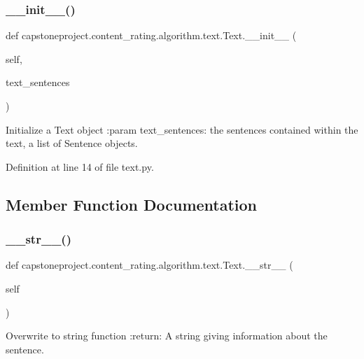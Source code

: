 \subsubsection{\texorpdfstring{\+\_\+\+\_\+init\+\_\+\+\_\+()}{\_\_init\_\_()}}
{\footnotesize\ttfamily def capstoneproject.\+content\+\_\+rating.\+algorithm.\+text.\+Text.\+\_\+\+\_\+init\+\_\+\+\_\+ (\begin{DoxyParamCaption}\item[{}]{self,  }\item[{}]{text\+\_\+sentences }\end{DoxyParamCaption})}

\begin{DoxyVerb}Initialize a Text object
:param text_sentences: the sentences contained within the text, a list of Sentence objects.
\end{DoxyVerb}
 

Definition at line 14 of file text.\+py.



\subsection{Member Function Documentation}
\mbox{\label{classcapstoneproject_1_1content__rating_1_1algorithm_1_1text_1_1_text_a92e45e772ffcc9b5dd96c5607295d4f0}} 
\subsubsection{\texorpdfstring{\+\_\+\+\_\+str\+\_\+\+\_\+()}{\_\_str\_\_()}}
{\footnotesize\ttfamily def capstoneproject.\+content\+\_\+rating.\+algorithm.\+text.\+Text.\+\_\+\+\_\+str\+\_\+\+\_\+ (\begin{DoxyParamCaption}\item[{}]{self }\end{DoxyParamCaption})}

\begin{DoxyVerb}Overwrite to string function
:return: A string giving information about the sentence.
\end{DoxyVerb}
 

